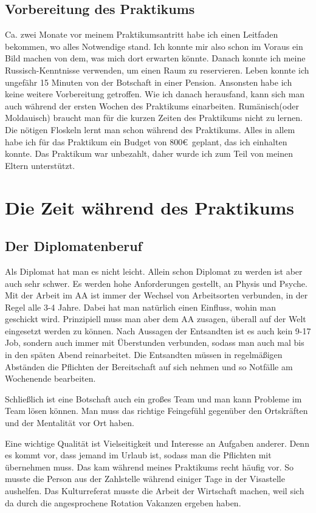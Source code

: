 \documentclass[12pt,a4paper, headsepline]{scrartcl}
\begin{document}
\subsection{Vorbereitung des Praktikums}
Ca. zwei Monate vor meinem Praktikumsantritt habe ich einen Leitfaden bekommen, wo alles Notwendige stand. Ich konnte mir also schon im Voraus ein Bild machen von dem, was mich dort erwarten könnte. Danach konnte ich meine Russisch-Kenntnisse verwenden, um einen Raum zu reservieren. Leben konnte ich ungefähr 15 Minuten von der Botschaft in einer Pension. Ansonsten habe ich keine weitere Vorbereitung getroffen. Wie ich danach herausfand, kann sich man auch während der ersten Wochen des Praktikums einarbeiten. Rumänisch(oder Moldauisch) braucht man für die kurzen Zeiten des Praktikums nicht zu lernen. Die nötigen Floskeln lernt man schon während des Praktikums. Alles in allem habe ich für das Praktikum ein Budget von 800\euro\ geplant, das ich einhalten konnte. Das Praktikum war unbezahlt, daher wurde ich zum Teil von meinen Eltern unterstützt.

\newpage
\section{Die Zeit während des Praktikums}

\subsection{Der Diplomatenberuf}
Als Diplomat hat man es nicht leicht. Allein schon Diplomat zu werden ist aber auch sehr schwer. Es werden hohe Anforderungen gestellt, an Physis und Psyche. Mit der Arbeit im AA ist immer der Wechsel von Arbeitsorten verbunden, in der Regel alle 3-4 Jahre. Dabei hat man natürlich einen Einfluss, wohin man geschickt wird. Prinzipiell muss man aber dem AA zusagen, überall auf der Welt eingesetzt werden zu können. Nach Aussagen der Entsandten ist es auch kein 9-17 Job, sondern auch immer mit Überstunden verbunden, sodass man auch mal bis in den späten Abend reinarbeitet. Die Entsandten müssen in regelmäßigen Abständen die Pflichten der Bereitschaft auf sich nehmen und so Notfälle am Wochenende bearbeiten.

Schließlich ist eine Botschaft auch ein großes Team und man kann Probleme im Team lösen können. Man muss das richtige Feingefühl gegenüber den Ortskräften und der Mentalität vor Ort haben.

Eine wichtige Qualität ist Vielseitigkeit und Interesse an Aufgaben anderer. Denn es kommt vor, dass jemand im Urlaub ist, sodass man die Pflichten mit übernehmen muss. Das kam während meines Praktikums recht häufig vor. So musste die Person aus der Zahlstelle während einiger Tage in der Visastelle aushelfen. Das Kulturreferat musste die Arbeit der Wirtschaft machen, weil sich da durch die angesprochene Rotation Vakanzen ergeben haben.
\end{document}

